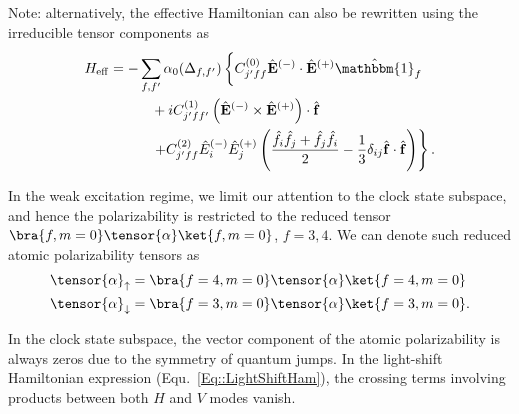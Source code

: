 \documentclass[]{report}
\begin{document}
Note: alternatively, the effective Hamiltonian can also be rewritten using the irreducible tensor components as
\begin{align}  
H_{\rm eff} &= - \sum_{f,f'}\alpha_0(\Delta_{f,f'}) \left\{ C_{j'ff}^{(0)} \hat{\mathbf{E}}^{(-)} \cdot \hat{\mathbf{E}}^{(+)} \hat{\mathbbm{1}}_f \phantom{\frac{\hat{1}}{1}}\right. \nonumber\\
&\quad\quad\quad + i C_{j'ff'}^{(1)} \left(\hat{\mathbf{E}}^{(-)} \times \hat{\mathbf{E}}^{(+)} \right) \cdot \hat{ \mathbf{f}} \nonumber\\
&\quad\quad\quad  \left. + C_{j'ff}^{(2)} \hat{E}_i^{(-)} \hat{E}_j^{(+)} \left( \frac{ \hat{f}_i \hat{f}_j  + \hat{f}_j \hat{f}_i  }{2} - \frac{1}{3}\delta_{ij} \hat{ \mathbf{f}} \cdot \hat{\mathbf{f}}  \right) \right\}. \label{Eq::LightShiftHam}
\end{align} 

In the weak excitation regime, we limit our attention to the clock state subspace, and hence the polarizability is restricted to the reduced tensor $ \bra{f,m=0}\tensor{\alpha}\ket{f,m=0}$, $f=3,4 $. We can denote such reduced atomic polarizability tensors as 
\begin{align}
\tensor{\alpha}_{\uparrow} &=\bra{f=4,m=0}\tensor{\alpha}\ket{f=4,m=0}\\
\tensor{\alpha}_{\downarrow} &=\bra{f=3,m=0}\tensor{\alpha}\ket{f=3,m=0}.
\end{align}


In the clock state subspace, the vector component of the atomic polarizability is always zeros due to the symmetry of quantum jumps. In the light-shift Hamiltonian expression (Equ.~\eqref{Eq::LightShiftHam}), the crossing terms involving products between both $ H $ and $ V $ modes vanish. 
\end{document}
